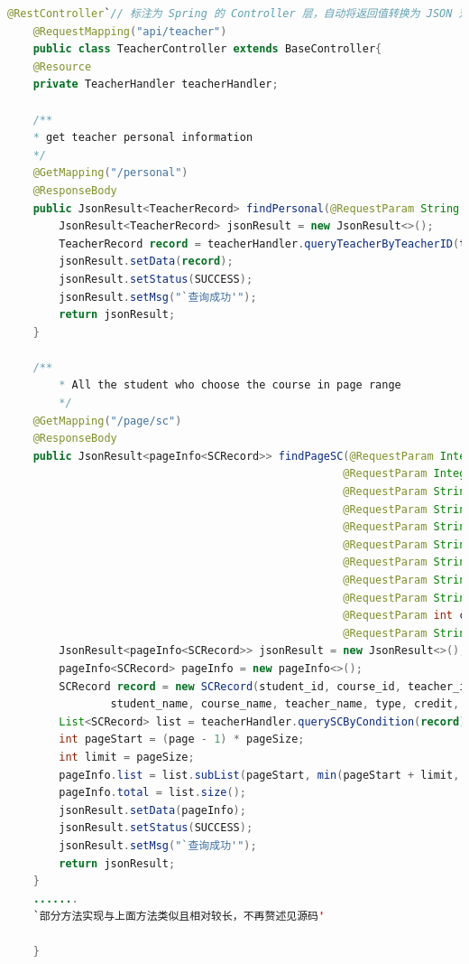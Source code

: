 \documentclass[12pt, a4paper]{article}
\begin{document}
\begin{lstlisting}[language=Java]
	@RestController`// 标注为 Spring 的 Controller 层，自动将返回值转换为 JSON 对象'
	@RequestMapping("api/teacher")
	public class TeacherController extends BaseController{
	@Resource
	private TeacherHandler teacherHandler;

	/**
	* get teacher personal information
	*/
	@GetMapping("/personal")
	@ResponseBody
	public JsonResult<TeacherRecord> findPersonal(@RequestParam String teacher_id) {
		JsonResult<TeacherRecord> jsonResult = new JsonResult<>();
		TeacherRecord record = teacherHandler.queryTeacherByTeacherID(teacher_id);
		jsonResult.setData(record);
		jsonResult.setStatus(SUCCESS);
		jsonResult.setMsg("`查询成功'");
		return jsonResult;
	}

	/**
		* All the student who choose the course in page range
		*/
	@GetMapping("/page/sc")
	@ResponseBody
	public JsonResult<pageInfo<SCRecord>> findPageSC(@RequestParam Integer page,
													@RequestParam Integer pageSize,
													@RequestParam String student_id,
													@RequestParam String student_name,
													@RequestParam String course_id,
													@RequestParam String course_name,
													@RequestParam String teacher_id,
													@RequestParam String teacher_name,
													@RequestParam String type,
													@RequestParam int credit,
													@RequestParam String place) {
		JsonResult<pageInfo<SCRecord>> jsonResult = new JsonResult<>();
		pageInfo<SCRecord> pageInfo = new pageInfo<>();
		SCRecord record = new SCRecord(student_id, course_id, teacher_id, 
				student_name, course_name, teacher_name, type, credit, place);
		List<SCRecord> list = teacherHandler.querySCByCondition(record);
		int pageStart = (page - 1) * pageSize;
		int limit = pageSize;
		pageInfo.list = list.subList(pageStart, min(pageStart + limit, list.size()));
		pageInfo.total = list.size();
		jsonResult.setData(pageInfo);
		jsonResult.setStatus(SUCCESS);
		jsonResult.setMsg("`查询成功'");
		return jsonResult;
	}
	.......
	`部分方法实现与上面方法类似且相对较长，不再赘述见源码'

	}
\end{lstlisting}
\end{document}
